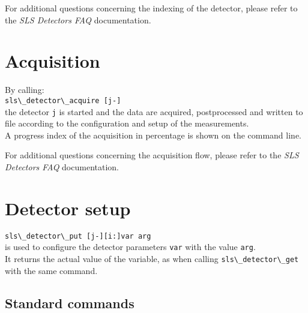 \documentclass{article}
\begin{document}
For additional questions concerning the indexing of the detector, please refer to the \textit{SLS Detectors FAQ} documentation.


\section{Acquisition}





By calling:\\
\verb=sls\_detector\_acquire [j-]=\\
the detector \verb=j= is started and the data are acquired, postprocessed and written to file according to the configuration and setup of the measurements.\\
A progress index of the acquisition in percentage is shown on the command line.

For additional questions concerning the acquisition flow, please refer to the \textit{SLS Detectors FAQ} documentation.

\section{Detector setup}

\verb=sls\_detector\_put [j-][i:]var arg=\\

is used to configure the detector parameters \verb=var= with the value \verb=arg=.\\
It returns the actual value of the variable, as when calling \verb=sls\_detector\_get= with the same command.

\subsection{Standard commands}
\end{document}
